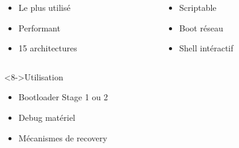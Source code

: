 \begin{frame}
		\begin{columns}
		\begin{column}{0.48\textwidth}
		\begin{itemize}
			\item<2-> Le plus utilisé
			\item<3-> Performant
			\item<4-> 15 architectures
		\end{itemize}
		\end{column}
		\begin{column}{0.48\textwidth}
		\begin{itemize}
			\item<5-> Scriptable
			\item<6-> Boot réseau
			\item<7-> Shell intéractif
		\end{itemize}
		\end{column}
		\end{columns}
		\vspace{0.5cm}
	\begin{block}<8->{Utilisation}
		\begin{itemize}
			\item Bootloader Stage 1 ou 2
			\item Debug matériel
			\item Mécanismes de recovery
		\end{itemize}
	\end{block}
\end{frame}

